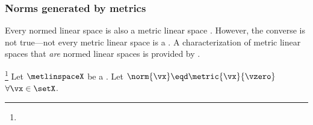 \subsubsection{Norms generated by metrics}
Every normed linear space is also a metric linear space . 
However, the converse is not true---not every metric linear space is a .
A characterization of metric linear spaces that \emph{are} normed linear spaces is provided by .
\begin{lemma}
\footnote{
  }
\label{lem:vsn_ti}
Let $\metlinspaceX$ be a .
Let $\norm{\vx}\eqd \metric{\vx}{\vzero}$ $\forall\vx\in\setX$.
\end{lemma}
